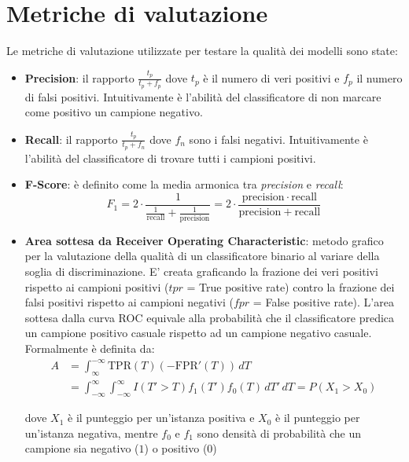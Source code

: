 \section{Metriche di valutazione}
\label{metriche}
Le metriche di valutazione utilizzate per testare la qualità dei modelli sono state:
\begin{itemize}
\item \textbf{Precision}: il rapporto $\frac{t_p}{t_p+f_p}$ dove $t_p$ è il numero di veri positivi e $f_p$ il numero di falsi positivi. Intuitivamente è l'abilità del classificatore di non marcare come positivo un campione negativo.
\item \textbf{Recall}: il rapporto $\frac{t_p}{t_p+f_n}$  dove $f_n$ sono i falsi negativi. Intuitivamente è l'abilità del classificatore di trovare tutti i campioni positivi.
\item \textbf{F-Score}: è definito come la media armonica tra \textit{precision} e \textit{recall}: 
\[F_1 = 2 \cdot \frac{1}{\tfrac{1}{\mathrm{recall}} + \tfrac{1}{\mathrm{precision}}} = 2 \cdot \frac{\mathrm{precision} \cdot \mathrm{recall}}{\mathrm{precision} + \mathrm{recall}}\]
\item \textbf{Area sottesa da Receiver Operating Characteristic}:  metodo grafico per la valutazione della qualità di un classificatore binario al variare della soglia di discriminazione. E' creata graficando la frazione dei veri positivi rispetto ai campioni positivi ($tpr$ = True positive rate) contro la frazione dei falsi positivi rispetto ai campioni negativi ($fpr$ = False positive rate). L'area sottesa dalla curva ROC equivale alla probabilità che il classificatore predica un campione positivo casuale rispetto ad un campione negativo casuale. Formalmente è definita da:
\begin{align*}
A & = \int_{\infty}^{-\infty} \mbox{TPR}(T) \left(-\mbox{FPR}'(T)\right) \, dT \\
& = \int_{-\infty}^{\infty} \int_{-\infty}^{\infty} I(T'>T)f_1(T') f_0(T) \, dT' \, dT = P(X_1 > X_0)
\end{align*}

dove 
$X_{1}$ è il punteggio per un'istanza positiva e $X_{0}$ è il punteggio per un'istanza negativa, mentre $f_{0}$ e $f_{1}$ sono densità di probabilità che un campione sia negativo ($1$) o positivo ($0$)
\end{itemize}

\newpage
